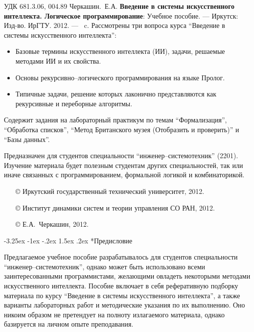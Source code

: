 \documentclass[12pt, openany, twoside]{book} %
\makeatletter
\newenvironment{mygroup}{}{}
\renewcommand\section{\@startsection {section}{1}{\z@}%
                                   {-3.25ex \@plus -1ex \@minus -.2ex}%
                                   {1.5ex \@plus.2ex}%
                                   {\normalfont\large\bfseries}}
\makeatother
\begin{document}
\newpage
\begin{mygroup}
\thispagestyle{empty}
\noindent УДК 681.3.06, 004.89
\vfill\footnotesize
{Черкашин.~Е.А.} {\bf Введение в системы искусственного интеллекта. Логическое программирование}: Учебное пособие. ---
Иркутск: Изд-во. ИрГТУ. 2012. --- \pageref{pg:lastpage}~c.
\vfill
Рассмотрены три вопроса курса ``Введение в системы искусственного интеллекта'':
\begin{itemize}
\item Базовые термины искусственного интеллекта (ИИ), задачи, решаемые методами
ИИ и их свойства.
\item Основы рекурсивно--логического программирования на языке Пролог.
\item Типичные задачи, решение которых лаконично представляются как рекурсивные и переборные алгоритмы.
\end{itemize}
Содержит задания на лабораторный практикум по темам ``Формализация'',
``Обработка списков'', ``Метод Британского музея (Отобразить и проверить)'' и ``Базы данных''.

    Предназначен для студентов специальности
``инженер--сис\-те\-мо\-тех\-ник'' (2201).
Изучение материала будет полезным студентам других специальностей, так или иначе связанных с программированием, формальной логикой и комбинаторикой.

\vfill\vfill

\vfill
\hbox{}\hfill
\begin{minipage}{0.6\linewidth}
\begin{itemize}
\setlength{\itemsep}{0pt}
\setlength{\parsep}{0pt}
\item[\copyright{}] Иркутский государственный технический университет, 2012.\item[\copyright{}] Институт динамики систем и теории управления СО РАН, 2012.
\item[\copyright{}] Е.А.~Черкашин, 2012.
\end{itemize}
\end{minipage}
\end{mygroup}
\tableofcontents
\clearpage

\newpage
\section*{Предисловие}
\thispagestyle{empty}

Предлагаемое учебное пособие разрабатывалось для студентов специальности ``инженер--сис\-те\-мо\-тех\-ник'', однако может быть использовано всеми заинтересованными программистами, желающими овладеть некоторыми методами искусственного интеллекта. Пособие включает в себя рефе\-ра\-тив\-ную подборку материала по курсу ``Введение в системы искусственного интеллекта'', а также варианты лабораторных работ и методические указания по их выполнению. Оно никоим образом не претендует на полноту излагаемого материала, однако базируется на личном опыте преподавания.
\end{document}
